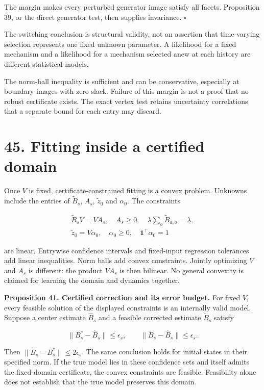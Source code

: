 \documentclass[11pt,letterpaper]{article}
\begin{document}
The margin makes every perturbed generator image satisfy all facets.
Proposition 39, or the direct generator test, then supplies invariance.
\(\square\)

The switching conclusion is structural validity, not an assertion that
time-varying selection represents one fixed unknown parameter. A
likelihood for a fixed mechanism and a likelihood for a mechanism
selected anew at each history are different statistical models.

The norm-ball inequality is sufficient and can be conservative,
especially at boundary images with zero slack. Failure of this margin is
not a proof that no robust certificate exists. The exact vertex test
retains uncertainty correlations that a separate bound for each entry
may discard.

\section{45. Fitting inside a certified
domain}\label{fitting-inside-a-certified-domain}

Once \(V\) is fixed, certificate-constrained fitting is a convex
problem. Unknowns include the entries of \(\widetilde B_s\), \(A_s\),
\(\widetilde z_0\) and \(\alpha_0\). The constraints

\[
\begin{gathered}
\widetilde B_sV=VA_s,\quad A_s\geq0,
\quad \lambda\sum_o\widetilde B_{a,o}=\lambda,\\
\widetilde z_0=V\alpha_0,\quad\alpha_0\geq0,
\quad\mathbf1^\top\alpha_0=1
\end{gathered}
\]

are linear. Entrywise confidence intervals and fixed-input regression
tolerances add linear inequalities. Norm balls add convex constraints.
Jointly optimizing \(V\) and \(A_s\) is different: the product \(VA_s\)
is then bilinear. No general convexity is claimed for learning the
domain and dynamics together.

\textbf{Proposition 41. Certified correction and its error budget.} For
fixed \(V\), every feasible solution of the displayed constraints is an
internally valid model. Suppose a center estimate \(\widehat B_s\) and a
feasible corrected estimate \(\widetilde B_s\) satisfy

\[
\|B_s^*-\widehat B_s\|\leq\epsilon_s,
\qquad
\|\widetilde B_s-\widehat B_s\|\leq\epsilon_s.
\]

Then \(\|\widetilde B_s-B_s^*\|\leq2\epsilon_s\). The same conclusion
holds for initial states in their specified norm. If the true model lies
in these confidence sets and itself admits the fixed-domain certificate,
the convex constraints are feasible. Feasibility alone does not
establish that the true model preserves this domain.
\end{document}
